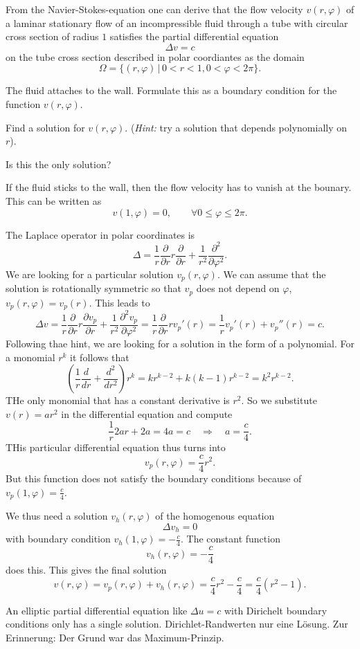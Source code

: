 From the Navier-Stokes-equation one can derive that the
flow velocity $v(r,\varphi)$ of a laminar stationary flow of an
incompressible fluid through a tube with circular cross section
of radius $1$ satisfies the partial differential equation
\[
\Delta v=c
\]
on the tube cross section described in polar coordiantes as the domain
\[
\Omega = \{ (r,\varphi)\,|\,0 < r < 1,0 < \varphi < 2\pi\}.
\]
\begin{teilaufgaben}
\item
The fluid attaches to the wall.
Formulate this as a boundary condition for the function $v(r,\varphi)$.
\item
Find a solution for $v(r,\varphi)$.
({\it Hint:} try a solution that depends polynomially on $r$).
\item
Is this the only solution?
\end{teilaufgaben}

\begin{loesung}
\begin{teilaufgaben}
\item
If the fluid sticks to the wall, then the flow velocity has to 
vanish at the bounary.
This can be written as
\[
v(1,\varphi)=0,\qquad\forall 0\le \varphi\le 2\pi.
\]
\item
The Laplace operator in polar coordinates is
\[
\Delta
=
\frac1r\frac{\partial}{\partial r}r\frac{\partial}{\partial r}
+\frac1{r^2}\frac{\partial^2}{\partial\varphi^2}.
\]
We are looking for a particular solution $v_p(r,\varphi)$.
We can assume that the solution is rotationally symmetric so that
$v_p$ does not depend on $\varphi$, 
$v_p(r,\varphi)=v_p(r)$.
This leads to
\[
\Delta v=
\frac1r\frac{\partial}{\partial r}r
\frac{\partial v_p}{\partial r}
+\frac1{r^2}\frac{\partial^2v_p}{\partial\varphi^2}
=
\frac1r\frac{\partial}{\partial r}rv_p'(r)
=
\frac1rv_p'(r)+v_p''(r)=c.
\]
Following thae hint, we are looking for a solution in the form of a
polynomial.
For a monomial $r^k$ it follows that
\[
\left(\frac1r\frac{d}{dr}+\frac{d^2}{dr^2}\right)r^k
=kr^{k-2}+k(k-1)r^{k-2}
=k^2 r^{k-2}.
\]
THe only monomial that has a constant derivative is $r^2$.
So we substitute $v(r)=ar^2$ in the differential equation and compute
\[
\frac1r2ar+2a
=
4a
=c
\quad
\Rightarrow
\quad
a=\frac{c}{4}.
\]
THis particular differential equation thus turns into
\[
v_p(r,\varphi)=\frac{c}{4}r^2.
\]
But this function does not satisfy the boundary conditions because of
$v_p(1,\varphi)=\frac{c}{4}$.

We thus need a solution $v_h(r,\varphi)$ of the homogenous equation
\[
\Delta v_h=0
\]
with boundary condition $v_h(1,\varphi)=-\frac{c}{4}$.
The constant function
\[
v_h(r,\varphi)=-\frac{c}{4}
\]
does this.
This gives the final solution
\[
v(r,\varphi)=v_p(r,\varphi)+v_h(r,\varphi)=\frac{c}{4}r^2 -\frac{c}{4}=
\frac{c}{4}(r^2-1).
\]
\item
An elliptic partial differential equation like
$\Delta u=c$ with Dirichelt boundary conditions only has a single 
solution.
Dirichlet-Randwerten nur eine Lösung. Zur Erinnerung: Der Grund
war das Maximum-Prinzip.
\qedhere
\end{teilaufgaben}
\end{loesung}
